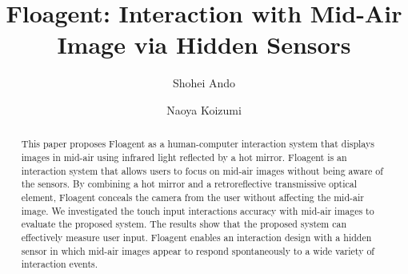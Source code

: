 \documentclass[sigconf]{acmart}
\begin{document}
\title{Floagent: Interaction with Mid-Air Image via Hidden Sensors}

\author{Shohei Ando}

\author{Naoya Koizumi}

\renewcommand{\shortauthors}{Trovato et al.}

\begin{abstract}
  This paper proposes Floagent as a human-computer interaction system that displays images in mid-air using infrared light reflected by a hot mirror. 
  Floagent is an interaction system that allows users to focus on mid-air images without being aware of the sensors.
  By combining a hot mirror and a retroreflective transmissive optical element, Floagent conceals the camera from the user without affecting the mid-air image.
  We investigated the touch input interactions accuracy with mid-air images to evaluate the proposed system. 
  The results show that the proposed system can effectively measure user input.
  Floagent enables an interaction design with a hidden sensor in which mid-air images appear to respond spontaneously to a wide variety of interaction events. 
\end{abstract}
\end{document}
